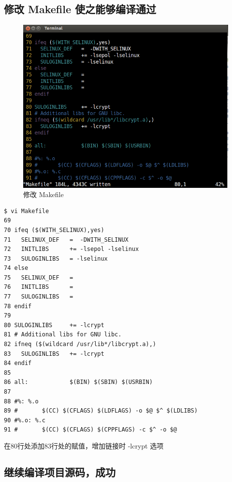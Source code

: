 \subsection{修改 Makefile 使之能够编译通过}

\begin{figure}[htbp]
\centering
\includegraphics{./pictures/1-3-makefile.png}
\caption{修改 Makefile}
\end{figure}

{\begin{shaded}\begin{verbatim}
$ vi Makefile 
69 
70 ifeq ($(WITH_SELINUX),yes)
71   SELINUX_DEF   =  -DWITH_SELINUX
72   INITLIBS      += -lsepol -lselinux
73   SULOGINLIBS   = -lselinux
74 else
75   SELINUX_DEF   =
76   INITLIBS      =
77   SULOGINLIBS   =
78 endif
79 
80 SULOGINLIBS     += -lcrypt
81 # Additional libs for GNU libc.
82 ifneq ($(wildcard /usr/lib*/libcrypt.a),)
83   SULOGINLIBS   += -lcrypt
84 endif
85 
86 all:            $(BIN) $(SBIN) $(USRBIN)
87 
88 #%: %.o
89 #       $(CC) $(CFLAGS) $(LDFLAGS) -o $@ $^ $(LDLIBS)
90 #%.o: %.c
91 #       $(CC) $(CFLAGS) $(CPPFLAGS) -c $^ -o $@
\end{verbatim}\end{shaded}}
在80行处添加83行处的赋值，增加链接时 -lcrypt 选项

\subsection{继续编译项目源码，成功}

